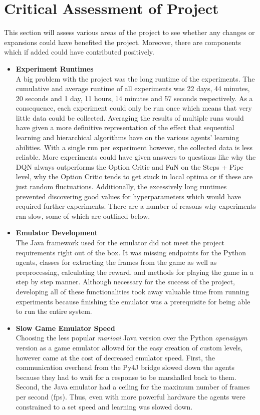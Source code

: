 \documentclass[notitlepage,a4paper,11pt]{article}
\begin{document}
\section{Critical Assessment of Project}
This section will assess various areas of the project to see whether any changes or expansions could have benefited the project. Moreover, there are components which if added could have contributed positively.

\begin{itemize}
	\item
	\textbf{Experiment Runtimes}\\
	A big problem with the project was the long runtime of the experiments. The cumulative and average runtime of all experiments was 22 days, 44 minutes, 20 seconds and 1 day, 11 hours, 14 minutes and 57 seconds respectively. As a consequence, each experiment could only be run once which means that very little data could be collected. Averaging the results of multiple runs would have given a more definitive representation of the effect that sequential learning and hierarchical algorithms have on the various agents' learning abilities. With a single run per experiment however, the collected data is less reliable. More experiments could have given answers to questions like why the DQN always outperforms the Option Critic and FuN on the Steps + Pipe level, why the Option Critic tends to get stuck in local optima or if these are just random fluctuations. Additionally, the excessively long runtimes prevented discovering good values for hyperparameters which would have required further experiments. There are a number of reasons why experiments ran slow, some of which are outlined below.
	
	
	
	\item
	\textbf{Emulator Development}\\
	The Java framework used for the emulator did not meet the project requirements right out of the box. It was missing endpoints for the Python agents, classes for extracting the frames from the game as well as preprocessing, calculating the reward, and methods for playing the game in a step by step manner. Although necessary for the success of the project, developing all of these functionalities took away valuable time from running experiments because finishing the emulator was a prerequisite for being able to run the entire system.
	
	\item
	\textbf{Slow Game Emulator Speed}\\
	Choosing the less popular \textit{marioai} Java version over the Python \textit{openaigym} version as a game emulator allowed for the easy creation of custom levels, however came at the cost of decreased emulator speed. First, the communication overhead from the Py4J bridge slowed down the agents because they had to wait for a response to be marshalled back to them. Second, the Java emulator had a ceiling for the maximum number of frames per second (fps). Thus, even with more powerful hardware the agents were constrained to a set speed and learning was slowed down.
	

\end{itemize}
\end{document}
